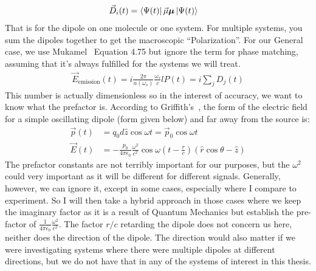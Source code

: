 \begin{align}
	\vec{D}_i(t) &= \Bra{\Psi(t)} \vec{\mu} \boldsymbol{\mu} \Ket{\Psi(t)}
\end{align}
That is for the dipole on one molecule or one system.  For multiple systems, you sum the dipoles together to get the macroscopic ``Polarization''.  For our General case, we use Mukamel~\cite{Mukamel1995} Equation 4.75 but ignore the term for phase matching, assuming that it's always fulfilled for the systems we will treat.
\begin{align}
	\vec{E}_{\text{emission}}(t) = i \frac{2 \pi}{n(\omega_s)} \frac{\omega_s}{c} l P(t) = i \sum_j D_{j}(t)
\end{align}
This number is actually dimensionless so in the interest of accuracy, we want to know what the prefactor is.  According to Griffith's~\cite{GriffithsEM}, the form of the electric field for a simple oscillating dipole (form given below) and far away from the source is:
\begin{align}
	\vec{p}(t) &= q_0 d \hat{z} \cos \omega t = \vec{p}_0 \cos \omega t \\
	\vec{E}(t) &= -\frac{p_0}{4 \pi \epsilon_0} \frac{\omega^2}{c^2} \cos \omega \left( t - \frac{r}{c} \right) \left(\hat{r} \cos \theta - \hat{z} \right)
\end{align}
The prefactor constants are not terribly important for our purposes, but the  $\omega^2$ could very important as it will be different for different signals.  Generally, however, we can ignore it, except in some cases, especially where I compare to experiment.  So I will then take a hybrid approach in those cases where we keep the imaginary factor as it is a result of Quantum Mechanics but establish the pre-factor of $\frac{1}{4 \pi \epsilon_0} \frac{\omega^2}{c^2}$.  The factor $r/c$ retarding the dipole does not concern us here, neither does the direction of the dipole.  The direction would also matter if we were investigating systems where there were multiple dipoles at different directions, but we do not have that in any of the systems of interest in this thesis.


